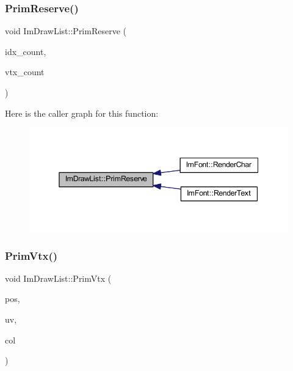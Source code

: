 \subsubsection{\texorpdfstring{Prim\+Reserve()}{PrimReserve()}}
{\footnotesize\ttfamily void Im\+Draw\+List\+::\+Prim\+Reserve (\begin{DoxyParamCaption}\item[{int}]{idx\+\_\+count,  }\item[{int}]{vtx\+\_\+count }\end{DoxyParamCaption})}

Here is the caller graph for this function\+:
\nopagebreak
\begin{figure}[H]
\begin{center}
\leavevmode
\includegraphics[width=345pt]{struct_im_draw_list_a879aa38dbfb0344e3e023d65c002c7d7_icgraph}
\end{center}
\end{figure}
\mbox{\label{struct_im_draw_list_a405377158f0028ad8b4fb6509eef4532}} 
\subsubsection{\texorpdfstring{Prim\+Vtx()}{PrimVtx()}}
{\footnotesize\ttfamily void Im\+Draw\+List\+::\+Prim\+Vtx (\begin{DoxyParamCaption}\item[{const \mbox{\hyperlink{struct_im_vec2}{Im\+Vec2}} \&}]{pos,  }\item[{const \mbox{\hyperlink{struct_im_vec2}{Im\+Vec2}} \&}]{uv,  }\item[{\mbox{\hyperlink{imgui_8h_a118cff4eeb8d00e7d07ce3d6460eed36}{Im\+U32}}}]{col }\end{DoxyParamCaption})\hspace{0.3cm}{\ttfamily [inline]}}

\mbox{\label{struct_im_draw_list_a42b72f87a0084c02f11dcd1560c8bbc7}} 
